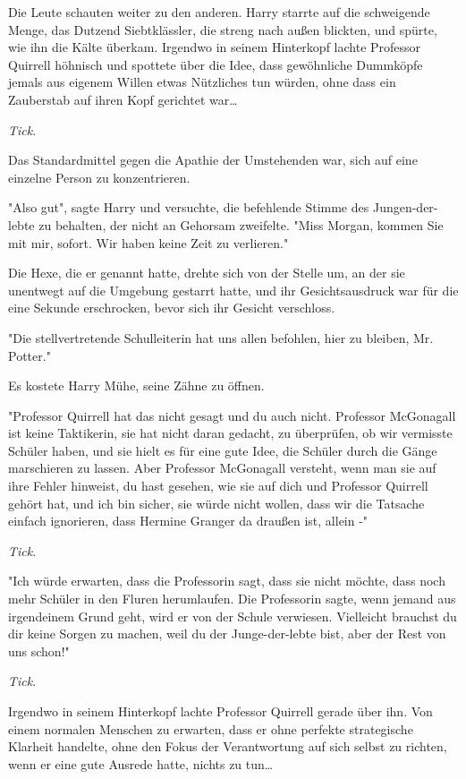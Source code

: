 {Die Leute schauten weiter zu den anderen. Harry starrte auf die schweigende Menge, das Dutzend Siebtklässler, die streng nach außen blickten, und spürte, wie ihn die Kälte überkam. Irgendwo in seinem Hinterkopf lachte Professor Quirrell höhnisch und spottete über die Idee, dass gewöhnliche Dummköpfe jemals aus eigenem Willen etwas Nützliches tun würden, ohne dass ein Zauberstab auf ihren Kopf gerichtet war…

\emph{Tick}.

Das Standardmittel gegen die Apathie der Umstehenden war, sich auf eine einzelne Person zu konzentrieren.

"Also gut", sagte Harry und versuchte, die befehlende Stimme des Jungen-der-lebte zu behalten, der nicht an Gehorsam zweifelte. "Miss Morgan, kommen Sie mit mir, sofort. Wir haben keine Zeit zu verlieren."

Die Hexe, die er genannt hatte, drehte sich von der Stelle um, an der sie unentwegt auf die Umgebung gestarrt hatte, und ihr Gesichtsausdruck war für die eine Sekunde erschrocken, bevor sich ihr Gesicht verschloss.

"Die stellvertretende Schulleiterin hat uns allen befohlen, hier zu bleiben, Mr. Potter."

Es kostete Harry Mühe, seine Zähne zu öffnen.

"Professor Quirrell hat das nicht gesagt und du auch nicht. Professor McGonagall ist keine Taktikerin, sie hat nicht daran gedacht, zu überprüfen, ob wir vermisste Schüler haben, und sie hielt es für eine gute Idee, die Schüler durch die Gänge marschieren zu lassen. Aber Professor McGonagall versteht, wenn man sie auf ihre Fehler hinweist, du hast gesehen, wie sie auf dich und Professor Quirrell gehört hat, und ich bin sicher, sie würde nicht wollen, dass wir die Tatsache einfach ignorieren, dass Hermine Granger da draußen ist, allein -"

\emph{Tick}.

"Ich würde erwarten, dass die Professorin sagt, dass sie nicht möchte, dass noch mehr Schüler in den Fluren herumlaufen. Die Professorin sagte, wenn jemand aus irgendeinem Grund geht, wird er von der Schule verwiesen. Vielleicht brauchst du dir keine Sorgen zu machen, weil du der Junge-der-lebte bist, aber der Rest von uns schon!"

\emph{Tick}.

Irgendwo in seinem Hinterkopf lachte Professor Quirrell gerade über ihn. Von einem normalen Menschen zu erwarten, dass er ohne perfekte strategische Klarheit handelte, ohne den Fokus der Verantwortung auf sich selbst zu richten, wenn er eine gute Ausrede hatte, nichts zu tun…

}
